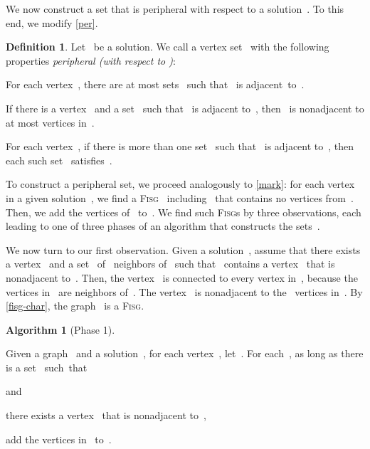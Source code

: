 \documentclass[12pt, a4paper, abstracton]{scrreprt}
\newcommand{\FISG}{\textsc{Fisg}}
\newcounter{theorem}
\theoremstyle{definition}
\newtheorem{definition}{Definition}[chapter]
\newtheorem{proc}{Algorithm}[chapter]
\theoremstyle{remark}
\begin{document}
\noindent We now construct a set that is peripheral with respect to a
solution~. To this end, we modify \autoref{per}.

\begin{definition}\label{per-s}Let~ be a solution. We call a vertex
  set~ with the following properties \emph{peripheral (with
    respect to )}:
  \begin{compactenum}
  \item\label{per-s1} For each vertex~, there are at most  sets~ such that~ is adjacent~to~.
  \item\label{per-s2} If there is a vertex~ and a set~ such that~ is adjacent to~, then~ is nonadjacent to at most  vertices in~.
  \item\label{per-s3} For each vertex~, if there is more than one set~ such that~ is adjacent to~, then each such set~ satisfies~.
  \end{compactenum}
\end{definition}

\noindent To construct a peripheral set, we proceed analogously to
\autoref{mark}: for each vertex~ in a given solution~, we find a
\FISG{}~ including~ that contains no vertices from~. Then, we add the vertices of~ to~. We find such
\FISG{}s by three observations, each leading to one of three phases of
an algorithm that constructs the sets~.

We now turn to our first observation. Given a solution~, assume that there exists a vertex~ and a set~ of~ neighbors of~ such that~ contains a vertex~ that is nonadjacent to~. Then, the vertex~ is connected to every vertex in~, because the vertices in~ are neighbors of~. The vertex~ is nonadjacent to the~ vertices in~. By \autoref{fisg-char}, the graph~ is a \FISG{}.
 
\begin{proc}[Phase 1]\label{mark-neighbors-s}
  \begin{samepage}
    Given a graph~ and a solution~, for each vertex~, let~. For each~, as long as there is a set~ such~that
    \begin{compactenum}

    \item  and
    \item there exists a vertex~ that is nonadjacent to~,
    \end{compactenum}
    add the vertices in~ to~.
  \end{samepage}
\end{proc}\setcounter{proc}{0}
\end{document}
